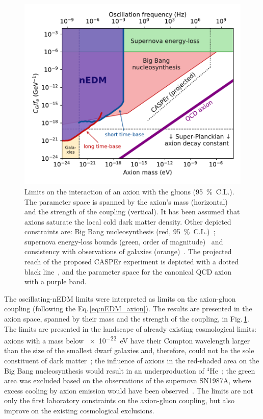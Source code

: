 \begin{figure}
  \centering
  \includegraphics[width=\linewidth]{gfx/axions/psi_ill_axion_limits_v7.pdf}
  \caption{Limits on the interaction of an axion with the gluons (\SI{95}{\percent}~C.L.).
  The parameter space is spanned by the axion's mass (horizontal) and the strength of the coupling (vertical).
  It has been assumed that axions saturate the local cold dark matter density.
  Other depicted constraints are: Big Bang nucleosynthesis (red, \SI{95}{\percent}~C.L.)~\cite{Blum2014,StadnikThesis,Stadnik2015D}; supernova energy-loss bounds (green, order of magnitude)~\cite{Graham2013,Raffelt1990Review,Raffelt2008LNP} and consistency with observations of galaxies (orange)~\cite{Marsh2015Review,Marsh2015B,Schive2015,Marsh2017}.
  The projected reach of the proposed CASPEr experiment is depicted with a dotted black line~\cite{CASPEr2014}, and the parameter space for the canonical QCD axion with a purple band.}
\label{fig:axions_limits_coupling}
\end{figure}

The oscillating-nEDM limits were interpreted as limits on the axion-gluon coupling (following the Eq.\,\ref{eq:nEDM_axion}).
The results are presented in the axion space, spanned by their mass and the strength of the coupling, in Fig.\,\ref{fig:axions_limits_coupling}.
The limits are presented in the landscape of already existing cosmological limits: axions with a mass below \SI{e-22}{\electronvolt} have their Compton wavelength larger than the size of the smallest dwarf galaxies and, therefore, could not be the sole constituent of dark matter~\cite{Marsh2015Review}; the influence of axions in the red-shaded area on the Big Bang nucleosynthesis would result in an underproduction of ${}^4$He~\cite{Blum2014}; the green area was excluded based on the observations of the supernova SN1987A, where excess cooling by axion emission would have been observed~\cite{Graham2013}.
The limits are not only the first laboratory constraints on the axion-gluon coupling, but also improve on the existing cosmological exclusions.




